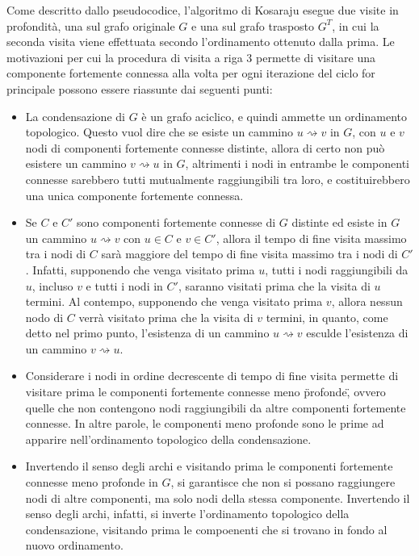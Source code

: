 Come descritto dallo pseudocodice, l'algoritmo di Kosaraju esegue due visite in profondit\`a, una sul grafo
originale $G$ e una sul grafo trasposto $G^T$, in cui la seconda visita viene effettuata secondo l'ordinamento
ottenuto dalla prima.
Le motivazioni per cui la procedura di visita a riga 3 permette di visitare una componente fortemente
connessa alla volta per ogni iterazione del ciclo for principale possono essere riassunte dai seguenti punti:
\begin{itemize}
    \item La condensazione di $G$ \`e un grafo aciclico, e quindi ammette un ordinamento topologico.
        Questo vuol dire che se esiste un cammino $u \rightsquigarrow v$ in $G$, con $u$ e $v$ nodi di componenti
        fortemente connesse distinte, allora di certo non pu\`o esistere un cammino $v \rightsquigarrow u$ in $G$,
        altrimenti i nodi in entrambe le componenti connesse sarebbero tutti mutualmente raggiungibili tra loro, e
        costituirebbero una unica componente fortemente connessa.
    \item Se $C$ e $C'$ sono componenti fortemente connesse di $G$ distinte ed esiste in $G$ un cammino
        $u \rightsquigarrow v$ con $u \in C$ e $v \in C'$, allora il tempo di fine visita massimo tra i nodi di $C$
        sar\`a maggiore del tempo di fine visita massimo tra i nodi di $C'$.
        Infatti, supponendo che venga visitato prima $u$, tutti i nodi raggiungibili da $u$, incluso $v$ e tutti i nodi
        in $C'$, saranno visitati prima che la visita di $u$ termini.
        Al contempo, supponendo che venga visitato prima $v$, allora nessun nodo di $C$ verr\`a visitato prima che
        la visita di $v$ termini, in quanto, come detto nel primo punto, l'esistenza di un cammino
        $u \rightsquigarrow v$ esculde l'esistenza di un cammino $v \rightsquigarrow u$.
    \item Considerare i nodi in ordine decrescente di tempo di fine visita permette di visitare prima le componenti
        fortemente connesse meno \"profonde\", ovvero quelle che non contengono nodi raggiungibili da altre
        componenti fortemente connesse.
        In altre parole, le componenti meno profonde sono le prime ad apparire nell'ordinamento topologico della
        condensazione.
    \item Invertendo il senso degli archi e visitando prima le componenti fortemente connesse meno profonde in $G$, si
        garantisce che non si possano raggiungere nodi di altre componenti, ma solo nodi della stessa componente.
        Invertendo il senso degli archi, infatti, si inverte l'ordinamento topologico della condensazione, visitando
        prima le compoenenti che si trovano in fondo al nuovo ordinamento.
\end{itemize}

